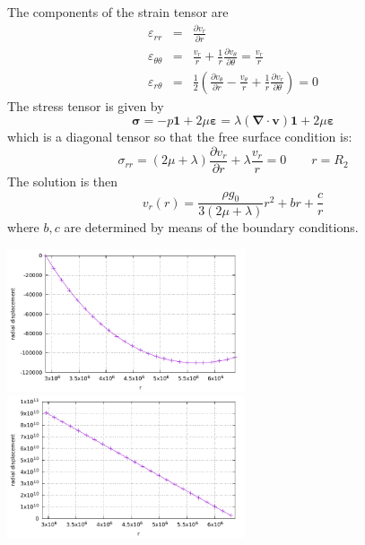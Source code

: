 The components of the strain tensor are 
\begin{eqnarray}
\varepsilon_{rr} &=& \frac{\partial v_r}{\partial r} \\
\varepsilon_{\theta\theta} &=& \frac{v_r}{r} + \frac{1}{r} \frac{\partial v_\theta}{\partial \theta}
= \frac{v_r}{r} 
 \\
\varepsilon_{r\theta} &=& \frac{1}{2} \left(   \frac{\partial v_\theta}{\partial r} - \frac{v_\theta}{r} 
+\frac{1}{r} \frac{\partial v_r}{\partial \theta}  \right) =0
\end{eqnarray}
The stress tensor is given by 
\[
{\bm \sigma} 
= - p {\bm 1} + 2\mu {\bm \varepsilon}
=  \lambda ({\bm \nabla}\cdot {\bm v}) {\bm 1} + 2\mu {\bm \varepsilon}
\]
which is a diagonal tensor so that the free surface condition is:
\[
\sigma_{rr} = (2\mu+\lambda) \frac{\partial v_r}{\partial r} +\lambda \frac{v_r}{r}   =0 \quad\quad r=R_2
\]
The solution is then 
\[
v_r(r) =  \frac{\rho g_0 }{3(2\mu + \lambda)} r^2 + br + \frac{c}{r}
\]
where $b,c$ are determined by means of the boundary conditions.


\begin{center}
\includegraphics[width=7cm]{python_codes/fieldstone_36/displacement_rtheta.pdf}
\includegraphics[width=7cm]{python_codes/fieldstone_36/pressure_rtheta.pdf}
\end{center}

